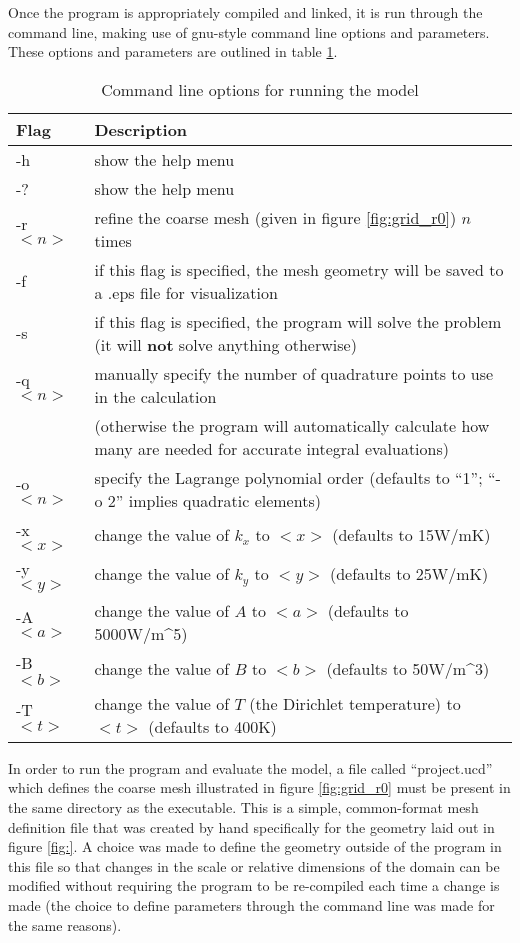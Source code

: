\documentclass[letterpaper,10pt]{article}
\begin{document}
Once the program is appropriately compiled and linked, it is run through the command line, making use of gnu-style command line options and parameters. These options and parameters are outlined in table \ref{tab:commandlineoptions}.

\begin{table}[H]
\centering
\caption{Command line options for running the model}
\label{tab:commandlineoptions}
\begin{tabular}{ll}
\hline \hline
Flag & Description \\
\hline
	-h & show the help menu \\
	-? & show the help menu \\
	-r $<n>$ & refine the coarse mesh (given in figure \ref{fig:grid_r0}) $n$ times \\
	-f & if this flag is specified, the mesh geometry will be saved to a .eps file for visualization \\
	-s & if this flag is specified, the program will solve the problem (it will \textbf{not} solve anything otherwise) \\
	-q $<n>$ & manually specify the number of quadrature points to use in the calculation \\
			 & (otherwise the program will automatically calculate how many are needed for accurate integral evaluations) \\
	-o $<n>$ & specify the Lagrange polynomial order (defaults to ``1''; ``-o 2'' implies quadratic elements) \\
	-x $<x>$ & change the value of $k_x$ to $<x>$ (defaults to \unit{15}{W/m\usk K}) \\
	-y $<y>$ & change the value of $k_y$ to $<y>$ (defaults to \unit{25}{W/m\usk K}) \\
	-A $<a>$ & change the value of $A$ to $<a>$ (defaults to \unit{5000}{W/m^5}) \\
	-B $<b>$ & change the value of $B$ to $<b>$ (defaults to \unit{50}{W/m^3}) \\
	-T $<t>$ & change the value of $T$ (the Dirichlet temperature) to $<t>$ (defaults to \unit{400}{K}) \\
\hline
\end{tabular}
\end{table}

In order to run the program and evaluate the model, a file called ``project.ucd'' which defines the coarse mesh illustrated in figure \ref{fig:grid_r0} must be present in the same directory as the executable. This is a simple, common-format mesh definition file that was created by hand specifically for the geometry laid out in figure \ref{fig:}. A choice was made to define the geometry outside of the program in this file so that changes in the scale or relative dimensions of the domain can be modified without requiring the program to be re-compiled each time a change is made (the choice to define parameters through the command line was made for the same reasons).
\end{document}
